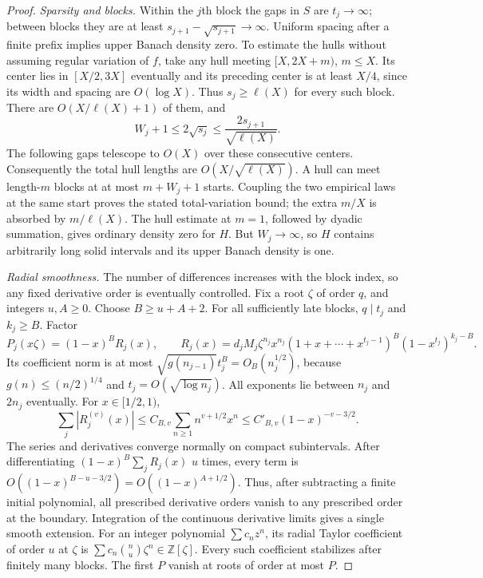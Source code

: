 \documentclass[11pt]{article}
\theoremstyle{plain}
\theoremstyle{definition}
\theoremstyle{remark}
\newcommand{\Z}{\mathbb{Z}}
\begin{document}
\begin{proof}
\emph{Sparsity and blocks.} Within the $j$th block the gaps in $S$ are
$t_j\to\infty$; between blocks they are at least
$s_{j+1}-\sqrt{s_{j+1}}\to\infty$. Uniform spacing after a finite prefix
implies upper Banach density zero. To estimate the hulls without assuming
regular variation of $f$, take any hull meeting $[X,2X+m)$, $m\le X$.
Its center lies in $[X/2,3X]$ eventually and its preceding center is at
least $X/4$, since its width and spacing are $O(\log X)$.
Thus $s_j\ge\ell(X)$ for every such block. There are
$O(X/\ell(X)+1)$ of them, and
\[
 W_j+1\le2\sqrt{s_j}\le\frac{2s_{j+1}}{\sqrt{\ell(X)}}.
\]
The following gaps telescope to $O(X)$ over these consecutive centers.
Consequently the total hull lengths are $O(X/\sqrt{\ell(X)})$.
A hull can meet length-$m$ blocks at at most $m+W_j+1$ starts. Coupling
the two empirical laws at the same start proves the stated total-variation
bound; the extra $m/X$ is absorbed by $m/\ell(X)$.
The hull estimate at $m=1$, followed by dyadic summation, gives ordinary
density zero for $H$. But $W_j\to\infty$, so $H$ contains arbitrarily
long solid intervals and its upper Banach density is one.

\emph{Radial smoothness.} The number of differences increases with the
block index, so any fixed derivative order is eventually controlled.
Fix a root $\zeta$ of order $q$, and integers $u,A\ge0$. Choose
$B\ge u+A+2$. For all sufficiently late blocks,
$q\mid t_j$ and $k_j\ge B$. Factor
\[
 P_j(x\zeta)=(1-x)^B R_j(x),\qquad
 R_j(x)=d_jM_j\zeta^{n_j}x^{n_j}
 (1+x+\cdots+x^{t_j-1})^B(1-x^{t_j})^{k_j-B}.
\]
Its coefficient norm is at most
$\sqrt{g(n_{j-1})}t_j^B=O_B(n_j^{1/2})$, because
$g(n)\le(n/2)^{1/4}$ and $t_j=O(\sqrt{\log n_j})$.
All exponents lie between $n_j$ and $2n_j$ eventually. For $x\in[1/2,1)$,
\[
 \sum_j|R_j^{(v)}(x)|
 \le C_{B,v}\sum_{n\ge1}n^{v+1/2}x^n
 \le C'_{B,v}(1-x)^{-v-3/2}.
\]
The series and derivatives converge normally on compact subintervals.
After differentiating $(1-x)^B\sum_jR_j(x)$ $u$ times, every term is
$O((1-x)^{B-u-3/2})=O((1-x)^{A+1/2})$. Thus, after subtracting a
finite initial polynomial, all prescribed derivative orders vanish to
any prescribed order at the boundary. Integration of the continuous
derivative limits gives a single smooth extension. For an integer
polynomial $\sum c_nz^n$, its radial Taylor coefficient of order $u$
at $\zeta$ is $\sum c_n\binom nu\zeta^n\in\Z[\zeta]$.
Every such coefficient stabilizes after finitely many blocks. The
first $P$ vanish at roots of order at most $P$.


\end{proof}
\end{document}
